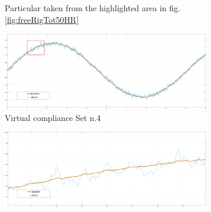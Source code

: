 \begin{figure}
\begin{subfigure}[h!]{1\linewidth}
		\caption{Particular taken from the highlighted area in fig.\ref{fig:freeRigTot50HR}}
		\label{fig:freeRigPar50HR}
	\end{subfigure}	
  \newline
	\begin{subfigure}[h!]{1\linewidth}
		\centering
		\includegraphics[width=\textwidth, height=\textwidth/4]{Images/set20freeTot50HtznoiseRect}
		\caption{Virtual compliance Set n.4}
		\label{fig:freeSetTot50HR}
	\end{subfigure}	
  \newline
	\begin{subfigure}[h!]{1\linewidth}
		\centering
		\includegraphics[width=\textwidth, height=\textwidth/4]{Images/set20freePart50Htznoise}

\end{subfigure}
\end{figure}
